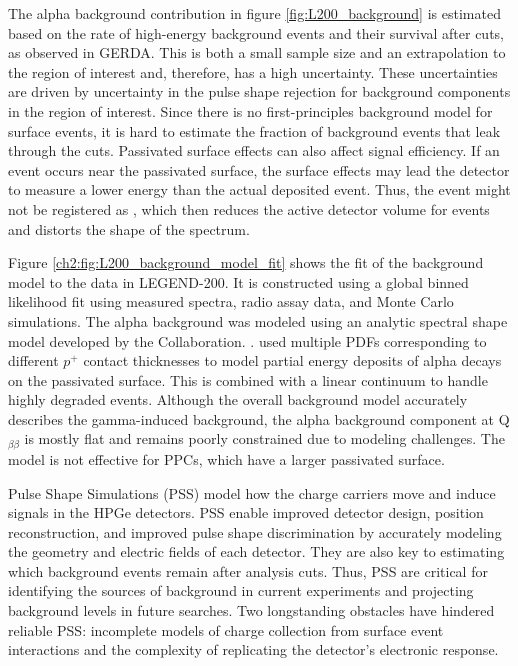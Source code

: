 The alpha background contribution in figure \ref{fig:L200_background} is estimated based on the rate of high-energy background events and their survival after cuts, as observed in GERDA. This is both a small sample size and an extrapolation to the {\onbb} region of interest and, therefore, has a high uncertainty. These uncertainties are driven by uncertainty in the pulse shape rejection for background components in the {\onbb} region of interest. Since there is no first-principles background model for surface events, it is hard to estimate the fraction of background events that leak through the cuts. Passivated surface effects can also affect signal efficiency. If an event occurs near the passivated surface, the surface effects may lead the detector to measure a lower energy than the actual deposited event. Thus, the event might not be registered as {\onbb}, which then reduces the active detector volume for {\onbb} events and distorts the shape of the {\tnbb} spectrum. 

Figure \ref{ch2:fig:L200_background_model_fit} shows the fit of the background model to the data in LEGEND-200. It is constructed using a global binned likelihood fit using measured spectra, radio assay data, and Monte Carlo simulations. The alpha background was modeled using an analytic spectral shape model developed by the {\Gerda} Collaboration. \cite{GERDA_2019cav}. {\Gerda} used multiple PDFs corresponding to different $p^+$ contact thicknesses to model partial energy deposits of alpha decays on the passivated surface. This is combined with a linear continuum to handle highly degraded events. Although the overall background model accurately describes the gamma-induced background, the alpha background component at Q$_{\beta \beta}$ is mostly flat and remains poorly constrained due to modeling challenges. The {\Gerda} model is not effective for {\MJ} PPCs, which have a larger passivated surface.

Pulse Shape Simulations (PSS) model how the charge carriers move and induce signals in the HPGe detectors. PSS enable improved detector design, position reconstruction, and improved pulse shape discrimination by accurately modeling the geometry and electric fields of each detector. They are also key to estimating which background events remain after analysis cuts. Thus, PSS are critical for identifying the sources of background in current experiments and projecting background levels in future searches. Two longstanding obstacles have hindered reliable PSS: incomplete models of charge collection from surface event interactions and the complexity of replicating the detector’s electronic response.

